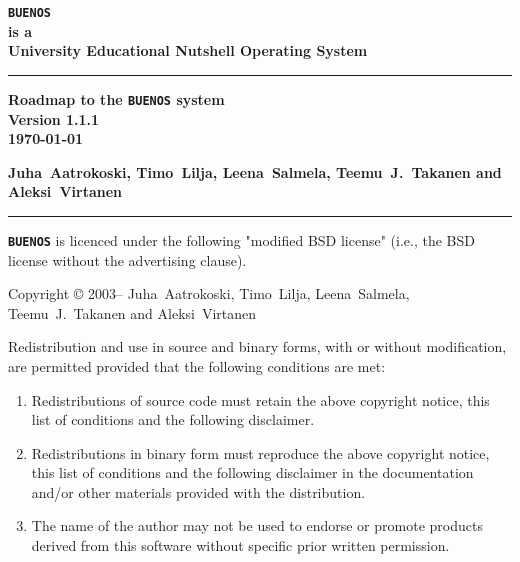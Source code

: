 \documentclass[twoside,a4paper]{report}
\newcommand{\buenos}{\texttt{\textbf{BUENOS}}}
\newcommand{\authors}{%
Juha~Aatrokoski, Timo~Lilja, Leena~Salmela, %
Teemu~J.~Takanen and Aleksi~Virtanen%
}
\begin{document}
\pagestyle{plain}
\begin{titlepage}
{
\raggedright\bfseries\Huge
\texttt{BUENOS}\\
\large
\hspace{1em}is a\\
University Educational Nutshell Operating System\\
\rule{\textwidth}{2mm}
\raggedleft\bfseries\large
Roadmap to the \texttt{BUENOS} system\\
Version 1.1.1\\
\today\\
\raggedright\bfseries\large
\authors{}\\
\rule{\textwidth}{1mm}
}
\newpage
{}
\noindent

\noindent\buenos{} is licenced under the following "modified BSD
license" (i.e., the BSD license without the advertising clause).

\begin{flushleft}
\vspace{\baselineskip}
Copyright \copyright{} 2003--\number\year{} \authors{}
\vspace{\baselineskip}
\end{flushleft}

Redistribution and use in source and binary forms, with or without
modification, are permitted provided that the following conditions
are met:

\begin{enumerate}
\item Redistributions of source code must retain the above copyright
    notice, this list of conditions and the following disclaimer.
\item Redistributions in binary form must reproduce the above
    copyright notice, this list of conditions and the following
    disclaimer in the documentation and/or other materials provided
    with the distribution.
\item The name of the author may not be used to endorse or promote
    products derived from this software without specific prior
    written permission.
\end{enumerate}


\end{titlepage}
\end{document}
